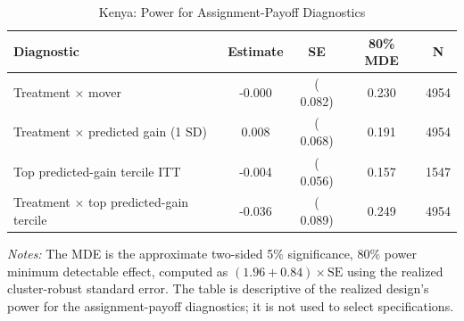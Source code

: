 \begin{table}[!htbp]
\centering
\caption{Kenya: Power for Assignment-Payoff Diagnostics}
\label{tab:assignment_payoff_kenya_power}
\begin{threeparttable}
\small
\begin{tabular}[t]{lcccc}
\toprule
Diagnostic & Estimate & SE & 80\% MDE & N \\
\midrule
Treatment \(\times\) mover &  -0.000 & (  0.082) &   0.230 & 4954 \\
Treatment \(\times\) predicted gain (1 SD) &   0.008 & (  0.068) &   0.191 & 4954 \\
Top predicted-gain tercile ITT &  -0.004 & (  0.056) &   0.157 & 1547 \\
Treatment \(\times\) top predicted-gain tercile &  -0.036 & (  0.089) &   0.249 & 4954 \\
\bottomrule
\end{tabular}
\begin{tablenotes}
\footnotesize
\item \textit{Notes:} The MDE is the approximate two-sided 5\% significance, 80\% power minimum detectable effect, computed as \((1.96+0.84)\times\text{SE}\) using the realized cluster-robust standard error. The table is descriptive of the realized design's power for the assignment-payoff diagnostics; it is not used to select specifications.
\end{tablenotes}
\end{threeparttable}
\end{table}
